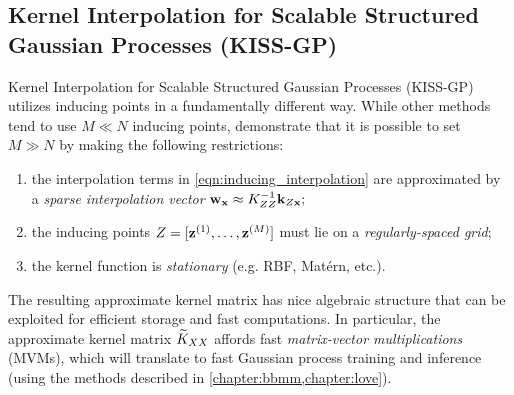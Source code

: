 \subsection{Kernel Interpolation for Scalable Structured Gaussian Processes (KISS-GP)}
Kernel Interpolation for Scalable Structured Gaussian Processes (KISS-GP) \cite{wilson2015kernel} utilizes inducing points in a fundamentally different way.
While other methods tend to use $M \ll N$ inducing points, \citet{wilson2015kernel} demonstrate that it is possible to set $M \gg N$ by making the following restrictions:
\begin{enumerate}
  \item the interpolation terms in \cref{eqn:inducing_interpolation} are approximated by a \emph{sparse interpolation vector} $\mathbf{w}_{\mathbf{x}} \approx K^{-1}_{ZZ} \mathbf{k}_{Z\mathbf{x}};$
  \item the inducing points $Z = [\mathbf{z}^{(1)}, \ldots, \mathbf{z}^{(M)}]$ must lie on a \emph{regularly-spaced grid};
  \item the kernel function is \emph{stationary} (e.g. RBF, Mat\'ern, etc.).
\end{enumerate}
The resulting approximate kernel matrix has nice algebraic structure that can be exploited for efficient storage and fast computations.
In particular, the approximate kernel matrix $\widetilde {K}_{XX}$ affords fast \emph{matrix-vector multiplications} (MVMs), which will translate to fast Gaussian process training and inference (using the methods described in \cref{chapter:bbmm,chapter:love}).

